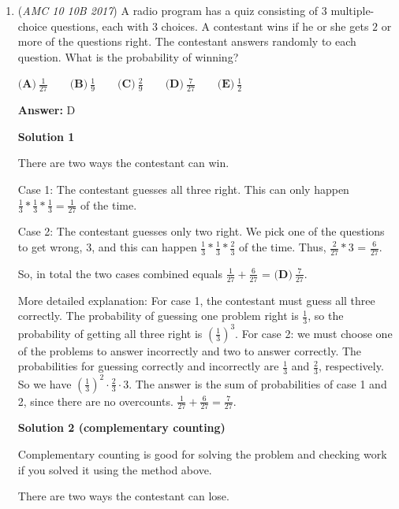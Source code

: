 \begin{enumerate}
 - youtube.com/indianmathguy

 


	\item (\textit{AMC 10 10B 2017}) A radio program has a quiz consisting of $3$ multiple-choice questions, each with $3$ choices. A contestant wins if he or she gets $2$ or more of the questions right. The contestant answers randomly to each question. What is the probability of winning?


 $\textbf{(A)}\ \frac{1}{27}\qquad\textbf{(B)}\ \frac{1}{9}\qquad\textbf{(C)}\ \frac{2}{9}\qquad\textbf{(D)}\ \frac{7}{27}\qquad\textbf{(E)}\ \frac{1}{2}$

 \textbf{Answer: }D



\textbf{Solution 1}

There are two ways the contestant can win.

 Case 1: The contestant guesses all three right. This can only happen $\frac{1}{3} * \frac{1}{3} * \frac{1}{3} = \frac{1}{27}$ of the time.

 Case 2: The contestant guesses only two right. We pick one of the questions to get wrong, $3$, and this can happen $\frac{1}{3} * \frac{1}{3} * \frac{2}{3}$ of the time. Thus, $\frac{2}{27} * 3$ = $\frac{6}{27}$.

 So, in total the two cases combined equals $\frac{1}{27} + \frac{6}{27}$ = $\boxed{\textbf{(D)}\ \frac{7}{27}}$.

 
More detailed explanation: For case 1, the contestant must guess all three correctly. The probability of guessing one problem right is $\frac{1}{3}$, so the probability of getting all three right is $\left(\frac{1}{3}\right)^{3}$. For case 2: we must choose one of the problems to answer incorrectly and two to answer correctly. The probabilities for guessing correctly and incorrectly are $\frac{1}{3}$ and $\frac{2}{3}$, respectively. So we have $\left(\frac{1}{3}\right)^{2}\cdot\frac{2}{3}\cdot3$. The answer is the sum of probabilities of case 1 and 2, since there are no overcounts. $\frac{1}{27}+\frac{6}{27}=\frac{7}{27}$.

 



\textbf{Solution 2 (complementary counting)}

Complementary counting is good for solving the problem and checking work if you solved it using the method above.

 There are two ways the contestant can lose.


\end{enumerate}
